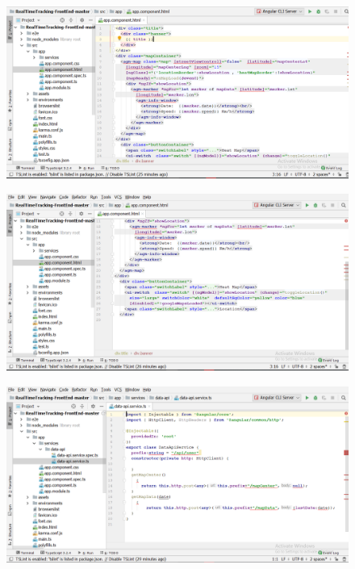 \begin{enumerate}
	\\
	\begin{figure}[!h]
		\centerline{\includegraphics[width=1.1\textwidth]{code16}}
	\end{figure}
	\begin{figure}[!h]
		\centerline{\includegraphics[width=1.1\textwidth]{code17}}
	\end{figure}
	\begin{figure}[!h]
		\centerline{\includegraphics[width=1.1\textwidth]{code18}}
	\end{figure}
	\begin{figure}[!h]

\end{figure}
\end{enumerate}
